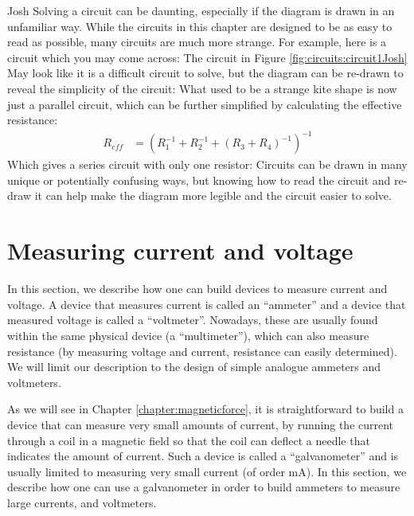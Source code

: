 \vspace{-0.25cm}
\begin{studentOpinion}{Josh}{}
Solving a circuit can be daunting, especially if the diagram is drawn in an unfamiliar  way. While the circuits in this chapter are designed to be as easy to read as possible, many circuits are much more strange. For example, here is a circuit which you may come across:
The circuit in Figure \ref{fig:circuits:circuit1Josh} May look like it is a difficult circuit to solve, but the diagram can be re-drawn to reveal the simplicity of the circuit:
What used to be a strange kite shape is now just a parallel circuit, which can be further simplified by calculating the effective resistance:
\begin{align*}
R_{eff} &= (R_1^{-1}+R_2^{-1}+(R_3+R_4)^{-1})^{-1}
\end{align*}
Which gives a series circuit with only one resistor:
Circuits can be drawn in many unique or potentially confusing ways, but knowing how to read the circuit and re-draw it can help make the diagram more legible and the circuit easier to solve.
\end{studentOpinion}

\section{Measuring current and voltage}
In this section, we describe how one can build devices to measure current and voltage. A device that measures current is called an ``ammeter'' and a device that measured voltage is called a ``voltmeter''. Nowadays, these are usually found within the same physical device (a ``multimeter''), which can also measure resistance (by measuring voltage and current, resistance can easily determined). We will limit our description to the design of simple analogue ammeters and voltmeters. 

As we will see in Chapter \ref{chapter:magneticforce}, it is straightforward to build a device that can measure very small amounts of current, by running the current through a coil in a magnetic field so that the coil can deflect a needle that indicates the amount of current. Such a device is called a ``galvanometer'' and is usually limited to measuring very small current (of order \si{mA}). In this section, we describe how one can use a galvanometer in order to build ammeters to measure large currents, and voltmeters. 
